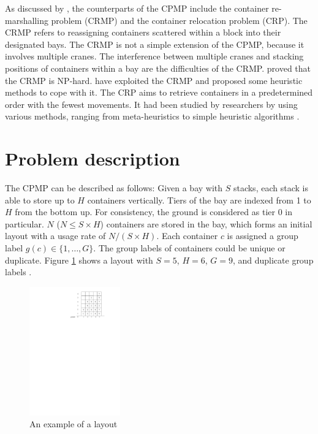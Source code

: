 \documentclass[review,3p,times,authoryear,12pt]{elsarticle}
\begin{document}
As discussed by \cite{Caserta2011}, the counterparts of the CPMP include the container re-marshalling problem (CRMP) and the container relocation problem (CRP).
The CRMP refers to reassigning containers scattered within a block into their designated bays.
The CRMP is not a simple extension of the CPMP, because it involves multiple cranes.
The interference between multiple cranes and stacking positions of containers within a bay are the difficulties of the CRMP.
\cite{Caserta2011} proved that the CRMP is NP-hard.
\cite{Kim1998, Kang2006Plan, Park2009Plan, Choe2011} have exploited the CRMP and proposed some heuristic methods to cope with it.
The CRP aims to retrieve containers in a predetermined order with the fewest movements.
It had been studied by researchers by using various methods, ranging from meta-heuristics to simple heuristic algorithms \citep{Kim2006A, Yang2006A, Caserta2009A,Caserta2009Applying,Lee2010A,Caserta2012AM, Forster2012A, Zhu2012Iter,Jin2015}.


\section{Problem description}
\label{sec:pd}

The CPMP can be described as follows: Given a bay with $S$ stacks, each stack is able to store up to $H$ containers vertically.
Tiers of the bay are indexed from 1 to $H$ from the bottom up.
For consistency, the ground is considered as tier 0 in particular.
$N$ ($N\le S\times H$) containers are stored in the bay, which forms an initial layout with a usage rate of $N/(S\times H)$.
Each container $c$ is assigned a group label $g(c)\in \{1,\dots,G\}$.
The group labels of containers could be unique or duplicate.
Figure \ref{fig3} shows a layout with $S=5$, $H=6$, $G=9$, and duplicate group labels .

\begin{figure}[!htb]
\centering
\includegraphics[width=0.35\textwidth]{fig3.pdf}
\caption{An example of a layout}
\label{fig3}
\end{figure}
\end{document}
